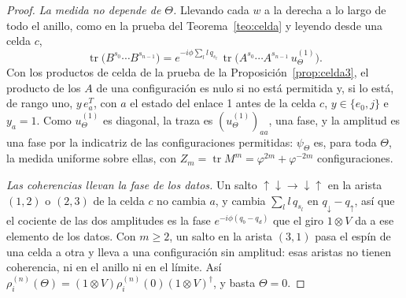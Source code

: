 \documentclass[11pt,a4paper]{article}
\theoremstyle{remark}
\newcommand{\tr}{\operatorname{tr}}
\begin{document}
\begin{proof}
\emph{La medida no depende de $\Theta$.} Llevando cada $w$ a la derecha a lo largo de todo el
anillo, como en la prueba del Teorema~\ref{teo:celda} y leyendo desde una celda $c$,
\[
  \tr\big(B^{s_0}\cdots B^{s_{n-1}}\big)=e^{-i\phi\sum_ll\,q_{s_l}}\,
  \tr\big(A^{s_0}\cdots A^{s_{n-1}}\,u^{(1)}_{\Theta}\big).
\]
Con los productos de celda de la prueba de la Proposición~\ref{prop:celda3}, el producto de los
$A$ de una configuración es nulo si no está permitida y, si lo está, de rango uno, $y\,e_a^T$, con
$a$ el estado del enlace 1 antes de la celda $c$, $y\in\{e_0,j\}$ e $y_a=1$. Como
$u^{(1)}_\Theta$ es diagonal, la traza es $(u^{(1)}_\Theta)_{aa}$, una fase, y la amplitud es una
fase por la indicatriz de las configuraciones permitidas: $\psi_\Theta$ es, para toda $\Theta$, la medida uniforme sobre ellas, con
$Z_m=\tr M^m=\varphi^{2m}+\varphi^{-2m}$ configuraciones.

\emph{Las coherencias llevan la fase de los datos.} Un salto $\uparrow\downarrow\to
\downarrow\uparrow$ en la arista $(1,2)$ o $(2,3)$ de la celda $c$ no cambia $a$, y cambia
$\sum_ll\,q_{s_l}$ en $q_\downarrow-q_\uparrow$, así que el cociente de las dos amplitudes es la
fase $e^{-i\phi(q_b-q_d)}$ que el giro $1\otimes V$ da a ese elemento de los datos. Con $m\ge2$, un
salto en la arista $(3,1)$ pasa el espín de una celda a otra y lleva a una configuración sin
amplitud: esas aristas no tienen coherencia, ni en el anillo ni en el límite. Así
$\rho^{(n)}_i(\Theta)=(1\otimes V)\rho^{(n)}_i(0)(1\otimes V)^\dagger$, y basta $\Theta=0$.


\end{proof}
\end{document}
